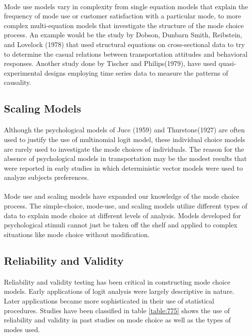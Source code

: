 \paragraph{}Mode use models vary in complexity from single equation models that explain the frequency of mode use or customer satisfaction with a particular mode, to more complex multi-equation models that investigate the structure of the mode choice process. An example would be the study by Dobson, Dunbarn Smith, Reibstein, and Lovelock (1978) that used structural equations on cross-sectional data to try to determine the casual relations between transportation attitudes and behavioral responses. Another study done by Tischer and Philips(1979), have used quasi-experimental designs employing time series data to measure the patterns of causality.

\subsection{Scaling Models}
\paragraph{}Although the psychological models of Juce (1959) and Thurstone(1927) are often used to justify the use of multinomial logit model, these individual choice models are rarely used to investigate the mode choices of individuals.  The reason for the absence of psychological models in transportation may be the modest results that were reported in early studies in which deterministic vector models were used to analyze subjects preferences.
\paragraph{}Mode use and scaling models have expanded our knowledge of the mode choice process. The simple-choice, mode-use, and scaling models utilize different types of data to explain mode choice at different levels of analysis. Models developed for psychological stimuli cannot just be taken off the shelf and applied to complex situations like mode choice without modification.

\subsection{Reliability and Validity}
\paragraph{}Reliability and validity testing has been critical in constructing mode choice models. Early applications of logit analysis were largely descriptive in nature. Later applications became more sophisticated in their use of statistical procedures. Studies have been classified in table \ref{table:775} shows the use of reliability and validity in past studies on mode choice as well as the types of modes used.
 

